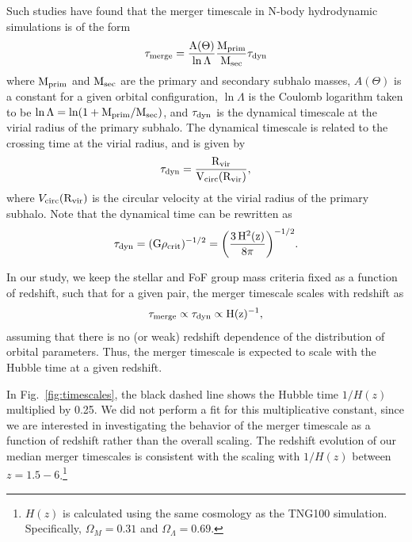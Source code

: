 \documentclass[twocolumn,linenumbers]{aastex631}
\begin{document}
        Such studies have found that the merger timescale in N-body hydrodynamic simulations is of the form
        \begin{equation}
            \rm \tau_{\rm merge} = \frac{A(\Theta)}{\ln \Lambda}\frac{\mprim}{\msec}\tau_{\rm dyn}
        \end{equation}
        where $\rm M_{prim}$ and $\rm M_{sec}$ are the primary and secondary subhalo masses, $A(\Theta)$ is a constant for a given orbital configuration, $\ln\Lambda$ is the Coulomb logarithm taken to be $\ln\Lambda = \ln(1+\rm M_{prim}/\rm M_{sec})$, and $\tau_{\rm dyn}$ is the dynamical timescale at the virial radius of the primary subhalo.
        The dynamical timescale is related to the crossing time at the virial radius, and is given by 
        \begin{equation}
            \rm \tau_{\rm dyn} = \frac{\Rvir}{V_{\rm circ}(\Rvir)},
        \end{equation}
        where $V_{\rm circ}(\rm R_{vir})$ is the circular velocity at the virial radius of the primary subhalo. 
        Note that the dynamical time can be rewritten as 
        \begin{equation}
            \rm \tau_{\rm dyn} = (G\rho_{crit})^{-1/2} = \bigg(\frac{3\,H^2(z)}{8\pi}\bigg)^{-1/2}.
        \end{equation}

        In our study, we keep the stellar and FoF group mass criteria fixed as a function of redshift, such that for a given pair, the merger timescale scales with redshift as
        \begin{equation}
            \rm \tau_{merge} \propto \tau_{dyn} \propto H(z)^{-1},
        \end{equation}
        assuming that there is no (or weak) redshift dependence of the distribution of orbital parameters.
        Thus, the merger timescale is expected to scale with the Hubble time at a given redshift. 
        
        In Fig.~\ref{fig:timescales}, the black dashed line shows the Hubble time $1/H(z)$ multiplied by 0.25. 
        We did not perform a fit for this multiplicative constant, since we are interested in investigating the behavior of the merger timescale as a function of redshift rather than the overall scaling. 
        The redshift evolution of our median merger timescales is consistent with the scaling with $1/H(z)$ between $z=1.5-6$.\footnote{$H(z)$ is calculated using the same cosmology as the TNG100 simulation. Specifically, $\Omega_M=0.31$ and $\Omega_{\Lambda}=0.69$.}
        
\end{document}
